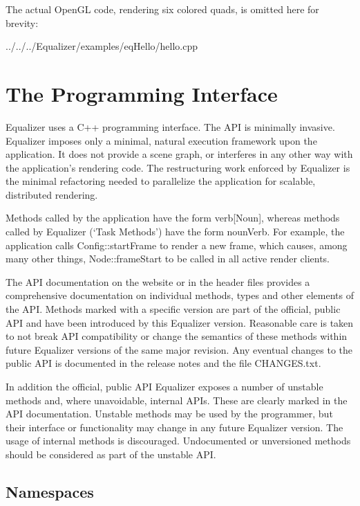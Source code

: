 \documentclass[10pt,a4]{scrartcl}
\begin{document}
The actual OpenGL code, rendering six colored quads, is omitted here for
brevity:

{\footnotesize
  {../../../Equalizer/examples/eqHello/hello.cpp}}


\section{The Programming Interface}

Equalizer uses a C++ programming interface. The API is minimally
invasive. Equalizer imposes only a minimal, natural execution framework upon the
application. It does not provide a scene graph, or interferes in any other way
with the application's rendering code. The restructuring work enforced by
Equalizer is the minimal refactoring needed to parallelize the application for
scalable, distributed rendering.

Methods called by the application have the form \textsf{verb[Noun]},
whereas methods called by Equalizer (`Task Methods') have the form
\textsf{nounVerb}. For example, the application calls
\textsf{Config::startFrame} to render a new frame, which causes, among
many other things, \textsf{Node::frameStart} to be called in all active
render clients.

The API documentation on the website or in the header files provides a
comprehensive documentation on individual methods, types and other elements of
the API. Methods marked with a specific version are part of the official, public
API and have been introduced by this Equalizer version. Reasonable care is taken
to not break API compatibility or change the semantics of these methods within
future Equalizer versions of the same major revision. Any eventual changes to
the public API is documented in the release notes and the file
\textsf{CHANGES.txt}.

In addition the official, public API Equalizer exposes a number of
unstable methods and, where unavoidable, internal APIs. These are clearly marked
in the API documentation. Unstable methods may be used by the programmer, but
their interface or functionality may change in any future Equalizer version. The
usage of internal methods is discouraged. Undocumented or unversioned methods
should be considered as part of the unstable API.

\subsection{\label{sNamespaces}Namespaces}
\end{document}
